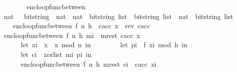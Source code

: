 \begin{isabellebody}
\ \ \ \ \ \ \ \ {\isacharparenright}{\kern0pt}{\isachardoublequoteclose}\isanewline
\isanewline
\isanewline
\isanewline
{}\isamarkupfalse%
\ enc{\isacharunderscore}{\kern0pt}loop{\isacharunderscore}{\kern0pt}func{\isacharunderscore}{\kern0pt}between\ \isanewline
\ \ {\isacharcolon}{\kern0pt}{\isacharcolon}{\kern0pt}\ {\isachardoublequoteopen}{\isacharparenleft}{\kern0pt}{\isacharparenleft}{\kern0pt}nat\ \ {\isacharequal}{\kern0pt}{\isachargreater}{\kern0pt}\ bitstring{\isacharparenright}{\kern0pt}\ {\isasymtimes}\ nat\ {\isasymtimes}\ nat\ {\isasymtimes}\ bitstring\ list{\isacharparenright}{\kern0pt}\ {\isasymRightarrow}\ bitstring\ list\ {\isasymRightarrow}\ nat\ {\isasymRightarrow}\ bitstring\ list{\isachardoublequoteclose}\ \isanewline
\ \ \isanewline
\ \ \ {\isachardoublequoteopen}enc{\isacharunderscore}{\kern0pt}loop{\isacharunderscore}{\kern0pt}func{\isacharunderscore}{\kern0pt}between\ {\isacharparenleft}{\kern0pt}f{\isacharcomma}{\kern0pt}\ n{\isacharcomma}{\kern0pt}\ h{\isacharcomma}{\kern0pt}\ {\isacharbrackleft}{\kern0pt}{\isacharbrackright}{\kern0pt}{\isacharparenright}{\kern0pt}\ c{\isacharunderscore}{\kern0pt}acc\ x\ {\isacharequal}{\kern0pt}\ rev\ c{\isacharunderscore}{\kern0pt}acc{\isachardoublequoteclose}\ {\isacharbar}{\kern0pt}\isanewline
\ \ \ {\isachardoublequoteopen}enc{\isacharunderscore}{\kern0pt}loop{\isacharunderscore}{\kern0pt}func{\isacharunderscore}{\kern0pt}between\ {\isacharparenleft}{\kern0pt}f{\isacharcomma}{\kern0pt}\ n{\isacharcomma}{\kern0pt}\ h{\isacharcomma}{\kern0pt}\ {\isacharparenleft}{\kern0pt}m{\isacharunderscore}{\kern0pt}i\ {\isacharhash}{\kern0pt}\ m{\isacharunderscore}{\kern0pt}rest{\isacharparenright}{\kern0pt}{\isacharparenright}{\kern0pt}\ c{\isacharunderscore}{\kern0pt}acc\ x\ {\isacharequal}{\kern0pt}\isanewline
\ \ \ \ \ \ \ \ {\isacharparenleft}{\kern0pt}let\ x{\isacharunderscore}{\kern0pt}i\ {\isacharequal}{\kern0pt}\ x\ {\isacharasterisk}{\kern0pt}\ x\ mod\ n\ in\isanewline
\ \ \ \ \ \ \ \ let\ p{\isacharunderscore}{\kern0pt}i\ {\isacharequal}{\kern0pt}\ f\ {\isacharparenleft}{\kern0pt}x{\isacharunderscore}{\kern0pt}i\ mod\ {}{\isacharcircum}{\kern0pt}h{\isacharparenright}{\kern0pt}\ in\isanewline
\ \ \ \ \ \ \ \ let\ c{\isacharunderscore}{\kern0pt}i\ {\isacharequal}{\kern0pt}\ xor{\isacharunderscore}{\kern0pt}list\ m{\isacharunderscore}{\kern0pt}i\ p{\isacharunderscore}{\kern0pt}i\ in\isanewline
\ \ \ \ \ \ \ \ enc{\isacharunderscore}{\kern0pt}loop{\isacharunderscore}{\kern0pt}func{\isacharunderscore}{\kern0pt}between\ {\isacharparenleft}{\kern0pt}f{\isacharcomma}{\kern0pt}\ n{\isacharcomma}{\kern0pt}\ h{\isacharcomma}{\kern0pt}\ m{\isacharunderscore}{\kern0pt}rest{\isacharparenright}{\kern0pt}\ {\isacharparenleft}{\kern0pt}c{\isacharunderscore}{\kern0pt}i\ {\isacharhash}{\kern0pt}\ c{\isacharunderscore}{\kern0pt}acc{\isacharparenright}{\kern0pt}\ x{\isacharunderscore}{\kern0pt}i\isanewline

\end{isabellebody}
